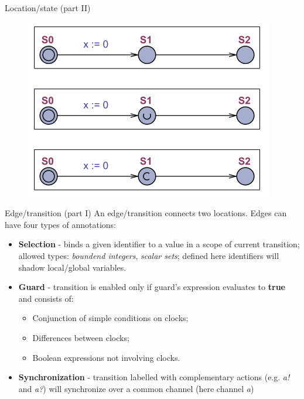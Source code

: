 \documentclass{beamer}
\begin{document}
\begin{frame}{Location/state (part II)}
		\begin{figure}[H]
			\includegraphics[scale=0.8]{img/todo_location_types.png}
		\end{figure}
\end{frame}

\begin{frame}{Edge/transition (part I)}
	An edge/transition connects two locations. Edges can have four types of annotations:
	
	\begin{itemize}
		\item \textbf{Selection} - binds a given identifier to a value in a scope of current transition; allowed types: \textit{boundend integers}, \textit{scalar sets}; defined here identifiers will shadow local/global variables.
		\item \textbf{Guard} - transition is enabled only if guard's expression evaluates to \textbf{true} and consists of:
		\begin{itemize}
			\item Conjunction of simple conditions on clocks;
			\item Differences between clocks;
			\item Boolean expressions not involving clocks.
		\end{itemize}
		\item \textbf{Synchronization} - transition labelled with complementary actions (e.g. \textit{a!} and \textit{a?}) will synchronize over a common channel (here channel \textit{a})
	\end{itemize}
	
\end{frame}
\end{document}
